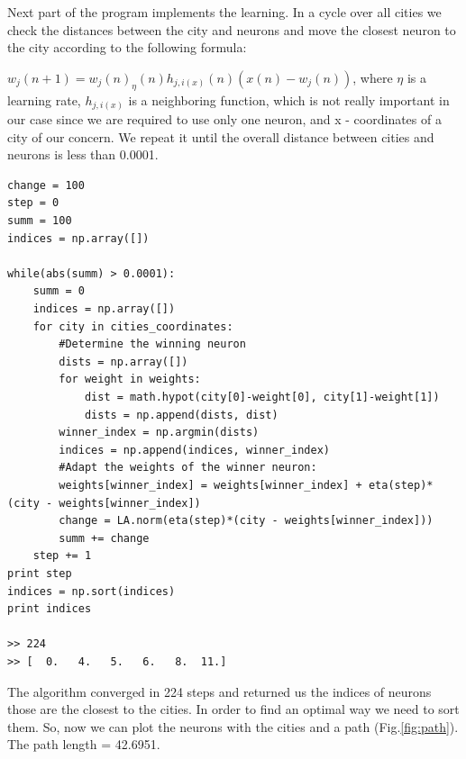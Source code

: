 \documentclass[a4paper, 12pt]{article}
\begin{document}
Next part of the program implements the learning. In a cycle over all cities we check the distances between the city and neurons and move the closest neuron to the city according to the following formula:

$w_j(n+1) = w_j(n) _ \eta(n) h_{j,i(x)}(n)(x(n) - w_j(n))$,
where $\eta$ is a learning rate, $h_{j,i(x)}$ is a neighboring function, which is not really important in our case since we are required to use only one neuron, and x - coordinates of a city of our concern. We repeat it until the overall distance between cities and neurons is less than 0.0001.


\lstset{language=Python}
\begin{lstlisting}[frame=single]
change = 100
step = 0
summ = 100
indices = np.array([])

while(abs(summ) > 0.0001):
    summ = 0
    indices = np.array([])
    for city in cities_coordinates:
        #Determine the winning neuron
        dists = np.array([])
        for weight in weights:
            dist = math.hypot(city[0]-weight[0], city[1]-weight[1])
            dists = np.append(dists, dist)
        winner_index = np.argmin(dists)
        indices = np.append(indices, winner_index)
        #Adapt the weights of the winner neuron:
        weights[winner_index] = weights[winner_index] + eta(step)*(city - weights[winner_index])
        change = LA.norm(eta(step)*(city - weights[winner_index]))
        summ += change
    step += 1
print step
indices = np.sort(indices)
print indices

>> 224
>> [  0.   4.   5.   6.   8.  11.]
\end{lstlisting}

The algorithm converged in 224 steps and returned us the indices of neurons those are the closest to the cities. In order to find an optimal way we need to sort them. So, now we can plot the neurons with the cities and a path (Fig.\ref{fig:path}). The path length = 42.6951.
\end{document}
